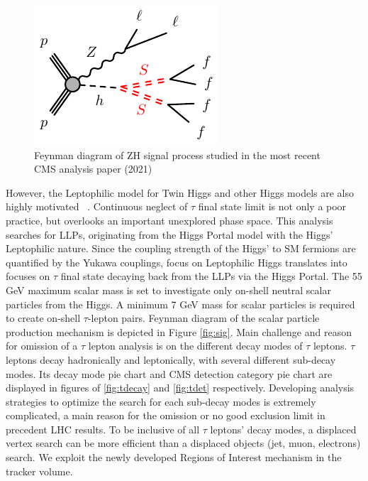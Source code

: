 \begin{figure}[h!]
  \caption{Feynman diagram of ZH signal process studied in the most recent CMS analysis paper (2021)}
  \label{fig:ZHfeyn}
  \centering
  \includegraphics[width=0.47\linewidth]{figs/Zh-llffff-SS.pdf}
\end{figure}

However, the Leptophilic model for Twin Higgs and other Higgs models are also highly motivated ~\cite{Lepto}. Continuous neglect of $\tau$ final state limit is not only a poor practice, but overlooks an important unexplored phase space. 
This analysis searches for LLPs, originating from the Higgs Portal model with the Higgs' Leptophilic nature.
Since the coupling strength of the Higgs' to SM fermions are quantified by the Yukawa couplings, focus on Leptophilic Higgs translates into focuses on $\tau$ final state decaying back from the LLPs via the Higgs Portal.
The 55 GeV maximum scalar mass is set to investigate only on-shell neutral scalar particles from the Higgs. 
A minimum 7 GeV mass for scalar particles is required to create on-shell $\tau$-lepton pairs.
Feynman diagram of the scalar particle production mechanism is depicted in Figure \ref{fig:sig}.
Main challenge and reason for omission of a $\tau$ lepton analysis is on the different decay modes of $\tau$ leptons. 
$\tau$ leptons decay hadronically and leptonically, with several different sub-decay modes.
Its decay mode pie chart and CMS detection category pie chart are displayed in figures of \ref{fig:tdecay} and \ref{fig:tdet} respectively.
Developing analysis strategies to optimize the search for each sub-decay modes is extremely complicated, a main reason for the omission or no good exclusion limit in precedent LHC results.
To be inclusive of all $\tau$ leptons' decay modes, a displaced vertex search can be more efficient than a displaced objects (jet, muon, electrons) search. 
We exploit the newly developed Regions of Interest mechanism in the tracker volume. 
